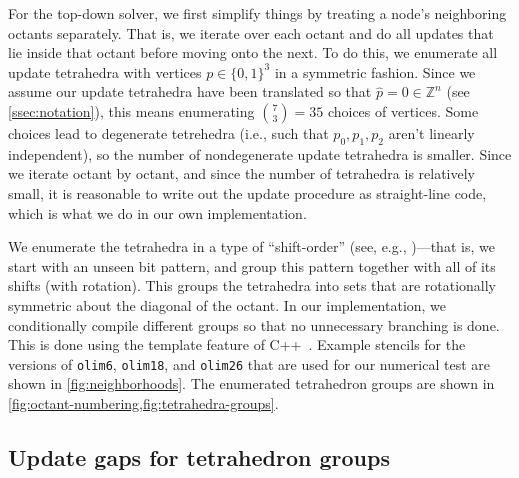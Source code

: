 \documentclass[eikonal.tex]{subfiles}
\begin{document}
For the top-down solver, we first simplify things by treating a node's
neighboring octants separately. That is, we iterate over each octant
and do all updates that lie inside that octant before moving onto the
next. To do this, we enumerate all update tetrahedra with vertices
$p \in \{0, 1\}^3$ in a symmetric fashion. Since we assume our update
tetrahedra have been translated so that $\hat{p} = 0 \in \mathbb{Z}^n$
(see \cref{ssec:notation}), this means enumerating
${7 \choose 3} = 35$ choices of vertices. Some choices lead to
degenerate tetrehedra (i.e., such that $p_0, p_1, p_2$ aren't linearly
independent), so the number of nondegenerate update tetrahedra is
smaller. Since we iterate octant by octant, and since the number of
tetrahedra is relatively small, it is reasonable to write out the
update procedure as straight-line code, which is what we do in our own
implementation.

We enumerate the tetrahedra in a type of ``shift-order'' (see, e.g.,
\cite{arndt2010matters})---that is, we start with an unseen bit
pattern, and group this pattern together with all of its shifts (with
rotation). This groups the tetrahedra into sets that are rotationally
symmetric about the diagonal of the octant. In our implementation, we
conditionally compile different groups so that no unnecessary
branching is done. This is done using the template feature of
C++~\cite{stroustrup2013c++}. Example stencils for the versions of
\texttt{olim6}, \texttt{olim18}, and \texttt{olim26} that are used for
our numerical test are shown in \cref{fig:neighborhoods}. The
enumerated tetrahedron groups are shown in
\cref{fig:octant-numbering,fig:tetrahedra-groups}.

\subsection{Update gaps for tetrahedron
  groups}\label{ssec:update-gaps}
\end{document}
